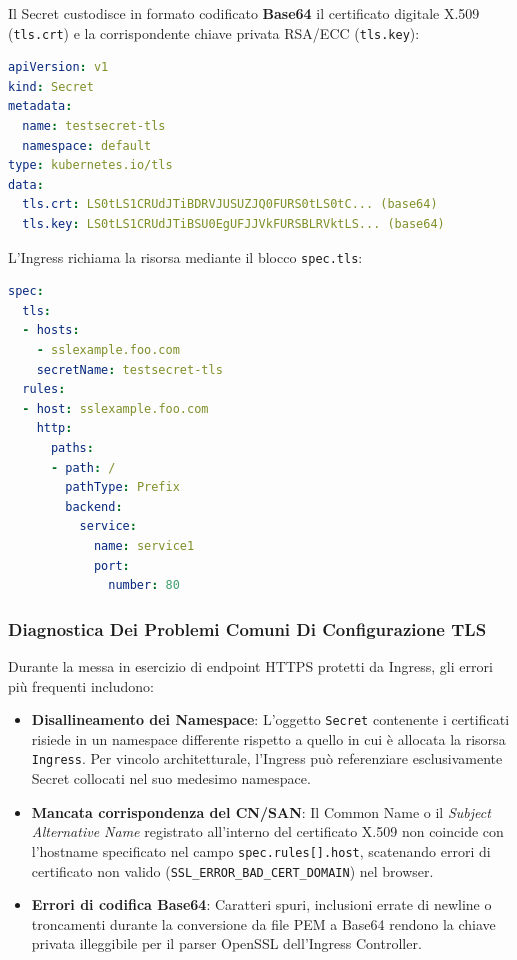 \documentclass[11pt, a4paper]{article}
\begin{document}

Il Secret custodisce in formato codificato \textbf{Base64} il certificato digitale X.509 (\texttt{tls.crt}) e la corrispondente chiave privata RSA/ECC (\texttt{tls.key}):

\begin{lstlisting}[language=yaml, caption={Manifest della risorsa Secret di tipo TLS}]
apiVersion: v1
kind: Secret
metadata:
  name: testsecret-tls
  namespace: default
type: kubernetes.io/tls
data:
  tls.crt: LS0tLS1CRUdJTiBDRVJUSUZJQ0FURS0tLS0tC... (base64)
  tls.key: LS0tLS1CRUdJTiBSU0EgUFJJVkFURSBLRVktLS... (base64)
\end{lstlisting}

L'Ingress richiama la risorsa mediante il blocco \texttt{spec.tls}:

\begin{lstlisting}[language=yaml, caption={Configurazione TLS nell'Ingress}]
spec:
  tls:
  - hosts:
    - sslexample.foo.com
    secretName: testsecret-tls
  rules:
  - host: sslexample.foo.com
    http:
      paths:
      - path: /
        pathType: Prefix
        backend:
          service:
            name: service1
            port:
              number: 80
\end{lstlisting}

\subsubsection{Diagnostica Dei Problemi Comuni Di Configurazione TLS}
Durante la messa in esercizio di endpoint HTTPS protetti da Ingress, gli errori più frequenti includono:
\begin{itemize}[noitemsep]
    \item \textbf{Disallineamento dei Namespace}: L'oggetto \texttt{Secret} contenente i certificati risiede in un namespace differente rispetto a quello in cui è allocata la risorsa \texttt{Ingress}. Per vincolo architetturale, l'Ingress può referenziare esclusivamente Secret collocati nel suo medesimo namespace.
    \item \textbf{Mancata corrispondenza del CN/SAN}: Il Common Name o il \emph{Subject Alternative Name} registrato all'interno del certificato X.509 non coincide con l'hostname specificato nel campo \texttt{spec.rules[].host}, scatenando errori di certificato non valido (\texttt{SSL\_ERROR\_BAD\_CERT\_DOMAIN}) nel browser.
    \item \textbf{Errori di codifica Base64}: Caratteri spuri, inclusioni errate di newline o troncamenti durante la conversione da file PEM a Base64 rendono la chiave privata illeggibile per il parser OpenSSL dell'Ingress Controller.
\end{itemize}
\end{document}
